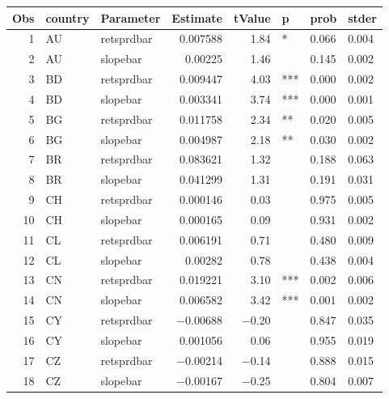 

\begin{longtable}{|r|l|l|r|r|l|l|l|}\hline
   Obs &    country &    Parameter &    Estimate &    tValue &    p &    prob &    stder\\\hline
\endhead
   1 &    AU &    retsprdbar &    0.007588 &    1.84 &    * &    0.066 &    0.004\\\hline
   2 &    AU &    slopebar &    0.00225 &    1.46 &      &    0.145 &    0.002\\\hline
   3 &    BD &    retsprdbar &    0.009447 &    4.03 &    *** &    0.000 &    0.002\\\hline
   4 &    BD &    slopebar &    0.003341 &    3.74 &    *** &    0.000 &    0.001\\\hline
   5 &    BG &    retsprdbar &    0.011758 &    2.34 &    ** &    0.020 &    0.005\\\hline
   6 &    BG &    slopebar &    0.004987 &    2.18 &    ** &    0.030 &    0.002\\\hline
   7 &    BR &    retsprdbar &    0.083621 &    1.32 &      &    0.188 &    0.063\\\hline
   8 &    BR &    slopebar &    0.041299 &    1.31 &      &    0.191 &    0.031\\\hline
   9 &    CH &    retsprdbar &    0.000146 &    0.03 &      &    0.975 &    0.005\\\hline
   10 &    CH &    slopebar &    0.000165 &    0.09 &      &    0.931 &    0.002\\\hline
   11 &    CL &    retsprdbar &    0.006191 &    0.71 &      &    0.480 &    0.009\\\hline
   12 &    CL &    slopebar &    0.00282 &    0.78 &      &    0.438 &    0.004\\\hline
   13 &    CN &    retsprdbar &    0.019221 &    3.10 &    *** &    0.002 &    0.006\\\hline
   14 &    CN &    slopebar &    0.006582 &    3.42 &    *** &    0.001 &    0.002\\\hline
   15 &    CY &    retsprdbar &    $-$0.00688 &    $-$0.20 &      &    0.847 &    0.035\\\hline
   16 &    CY &    slopebar &    0.001056 &    0.06 &      &    0.955 &    0.019\\\hline
   17 &    CZ &    retsprdbar &    $-$0.00214 &    $-$0.14 &      &    0.888 &    0.015\\\hline
   18 &    CZ &    slopebar &    $-$0.00167 &    $-$0.25 &      &    0.804 &    0.007\\\hline

\end{longtable}
